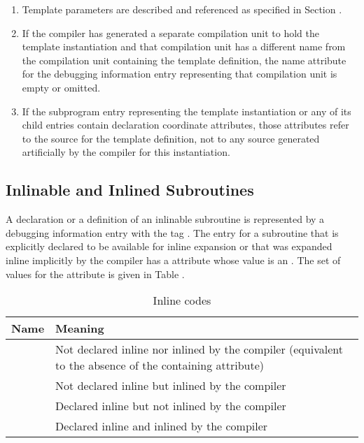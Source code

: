 \begin{enumerate}[1. ]
\item Template parameters are described and referenced as specified in
Section .

\item If the compiler has generated a separate compilation unit
to hold the template instantiation and that compilation unit
has a different name from the compilation unit containing
the template definition, the name attribute for the debugging
information entry representing that compilation unit is empty
or omitted.

\item If the subprogram entry representing the template
instantiation or any of its child entries contain declaration
coordinate attributes, those attributes refer to the source
for the template definition, not to any source generated
artificially by the compiler for this instantiation.
\end{enumerate}


\subsection{Inlinable and Inlined Subroutines}
\label{chap:inlinedsubroutines}
A declaration or a definition of an inlinable subroutine
is represented by a debugging information entry with the
tag \DWTAGsubprogram.
The entry for a subroutine 
that is\hypertarget{chap:DWATinlineinlinedsubroutine}{}
explicitly declared to be available for inline expansion or
that was expanded inline implicitly by the compiler has a
\DWATinlineDEFN{} attribute whose value is an 
. The
set of values for the \DWATinline{} attribute is given in
Table .

\begin{table}[h]
\centering
\caption{Inline codes}
\label{tab:inlinecodes}
\begin{tabular}{l|P{8cm}}
\hline
Name&Meaning\\ \hline
\DWINLnotinlinedTARG{} & Not declared inline nor inlined by the
  \mbox{compiler} (equivalent to the absence of the
  containing \DWATinline{} attribute) \\
\DWINLinlinedTARG{} & Not declared inline but inlined by the \mbox{compiler} \\
\DWINLdeclarednotinlinedTARG{} & Declared inline but 
  not inlined by the \mbox{compiler} \\
\DWINLdeclaredinlinedTARG{} & Declared inline and inlined by the 
  \mbox{compiler} \\
\hline
\end{tabular}
\end{table}


